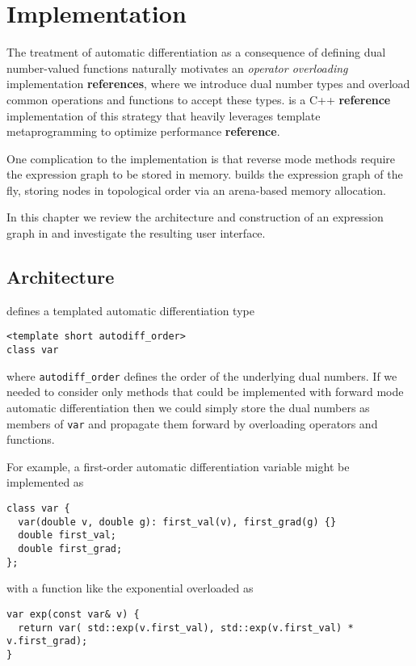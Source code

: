 \chapter{Implementation}

The treatment of automatic differentiation as a consequence of
defining dual number-valued functions naturally motivates an
\textit{operator overloading} implementation \textbf{references},
where we introduce dual number types and overload common
operations and functions to accept these types.  \nomad is a C++
\textbf{reference} implementation of this strategy that heavily 
leverages template metaprogramming to optimize performance 
\textbf{reference}.

One complication to the implementation is that reverse mode
methods require the expression graph to be stored in memory.
\nomad builds the expression graph of the fly, storing nodes
in topological order via an arena-based memory allocation.

In this chapter we review the architecture and construction of
an expression graph in \nomad and investigate the resulting
user interface.

\section{Architecture}

\nomad defines a templated automatic differentiation type
%
\begin{verbatim}
<template short autodiff_order>
class var
\end{verbatim}
%
where \verb|autodiff_order| defines the order of the underlying
dual numbers.  If we needed to consider only methods that
could be implemented with forward mode automatic differentiation
then we could simply store the dual numbers as members of
\verb|var| and propagate them forward by overloading operators
and functions.

For example, a first-order automatic differentiation variable
might be implemented as
%
\begin{verbatim}
class var {
  var(double v, double g): first_val(v), first_grad(g) {}
  double first_val;
  double first_grad;
};
\end{verbatim}
%
with a function like the exponential overloaded as
%
\begin{verbatim}
var exp(const var& v) {
  return var( std::exp(v.first_val), std::exp(v.first_val) * v.first_grad);
}
\end{verbatim}

